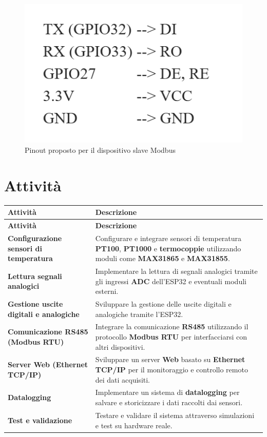 \documentclass[12pt,a4paper]{report}
\begin{document}
\begin{figure}[H]
    \centering
    \includegraphics[width=\linewidth]{../image/SlavePinout.png}
    \caption{Pinout proposto per il dispositivo slave Modbus}
\end{figure}

\chapter{Attività}

\begin{longtable}{|p{}|p{}|}
\hline
\textbf{Attività} & \textbf{Descrizione} \\ \hline
\endfirsthead
\hline
\textbf{Attività} & \textbf{Descrizione} \\ \hline
\endhead
\hline
\endfoot
\textbf{Configurazione sensori di temperatura} & Configurare e integrare sensori di temperatura \textbf{PT100}, \textbf{PT1000} e \textbf{termocoppie} utilizzando moduli come \textbf{MAX31865} e \textbf{MAX31855}. \\ \hline
\textbf{Lettura segnali analogici} & Implementare la lettura di segnali analogici tramite gli ingressi \textbf{ADC} dell'ESP32 e eventuali moduli esterni. \\ \hline
\textbf{Gestione uscite digitali e analogiche} & Sviluppare la gestione delle uscite digitali e analogiche tramite l'ESP32. \\ \hline
\textbf{Comunicazione RS485 (Modbus RTU)} & Integrare la comunicazione \textbf{RS485} utilizzando il protocollo \textbf{Modbus RTU} per interfacciarsi con altri dispositivi. \\ \hline
\textbf{Server Web (Ethernet TCP/IP)} & Sviluppare un server \textbf{Web} basato su \textbf{Ethernet TCP/IP} per il monitoraggio e controllo remoto dei dati acquisiti. \\ \hline
\textbf{Datalogging} & Implementare un sistema di \textbf{datalogging} per salvare e storicizzare i dati raccolti dai sensori. \\ \hline
\textbf{Test e validazione} & Testare e validare il sistema attraverso simulazioni e test su hardware reale. \\ \hline
\end{longtable}
\end{document}
